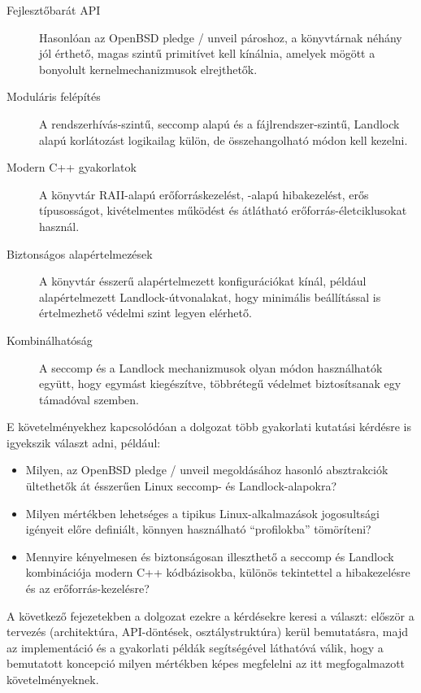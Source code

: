 \begin{description}
  \item[Fejlesztőbarát API]
  Hasonlóan az OpenBSD pledge / unveil pároshoz, a könyvtárnak
  néhány jól érthető, magas szintű primitívet kell kínálnia, amelyek mögött
  a bonyolult kernelmechanizmusok elrejthetők.

  \item[Moduláris felépítés]
  A rendszerhívás-szintű, seccomp alapú és a fájlrendszer-szintű, Landlock
  alapú korlátozást logikailag külön, de összehangolható módon kell kezelni.

  \item[Modern C++ gyakorlatok]
  A könyvtár RAII-alapú erőforráskezelést, -alapú
  hibakezelést, erős típusosságot, kivételmentes működést és átlátható
  erőforrás-életciklusokat használ.

  \item[Biztonságos alapértelmezések]
  A könyvtár ésszerű alapértelmezett konfigurációkat kínál, például
  alapértelmezett Landlock-útvonalakat, hogy minimális beállítással is
  értelmezhető védelmi szint legyen elérhető.

  \item[Kombinálhatóság]
  A seccomp és a Landlock mechanizmusok olyan módon használhatók együtt, hogy
  egymást kiegészítve, többrétegű védelmet biztosítsanak egy támadóval szemben.
\end{description}

E követelményekhez kapcsolódóan a dolgozat több gyakorlati kutatási kérdésre is
igyekszik választ adni, például:

\begin{itemize}
  \item Milyen, az OpenBSD pledge / unveil megoldásához
        hasonló absztrakciók ültethetők át ésszerűen Linux seccomp- és
        Landlock-alapokra?
  \item Milyen mértékben lehetséges a tipikus Linux-alkalmazások jogosultsági
        igényeit előre definiált, könnyen használható ``profilokba'' tömöríteni?
  \item Mennyire kényelmesen és biztonságosan illeszthető a seccomp és Landlock
        kombinációja modern C++ kódbázisokba, különös tekintettel a hibakezelésre
        és az erőforrás-kezelésre?
\end{itemize}

A következő fejezetekben a dolgozat ezekre a kérdésekre keresi a választ: először
a tervezés (architektúra, API-döntések, osztálystruktúra) kerül bemutatásra,
majd az implementáció és a gyakorlati példák segítségével láthatóvá válik, hogy
a bemutatott koncepció milyen mértékben képes megfelelni az itt megfogalmazott
követelményeknek.
